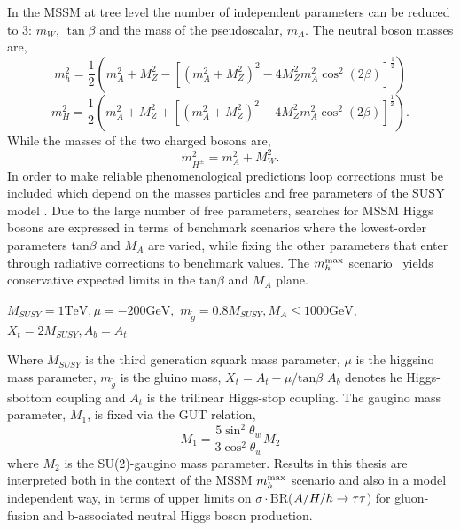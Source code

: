 In the MSSM at tree level the number of independent parameters can be reduced to 3: $m_{W}$,
$\tan{\beta}$ and the mass of the pseudoscalar, $m_{A}$. The neutral boson masses are,
\begin{equation}
m_{h}^{2}=\frac{1}{2}\left(m_{A}^{2}+M_{Z}^{2}-\left[(m_{A}^{2}+
M_{Z}^{2})^{2}-4M_{Z}^{2}m_{A}^{2}\cos^{2}{(2\beta)}\right]^{\frac{1}{2}}\right)
\end{equation}
\nobreak
\begin{equation}
m_{H}^{2}=\frac{1}{2}\left(m_{A}^{2}+M_{Z}^{2}+\left[(m_{A}^{2}+
M_{Z}^{2})^{2}-4M_{Z}^{2}m_{A}^{2}\cos^{2}{(2\beta)}\right]^{\frac{1}{2}}\right).
\end{equation}
While the masses of the two charged bosons are,
\begin{equation}
m_{H^{\pm}}^{2}=m_{A}^{2}+M_{W}^{2}.
\end{equation}
In order to make reliable phenomenological predictions loop corrections must be included
which depend on the masses particles and free parameters of the SUSY model .
Due to the large number of free parameters,
searches for MSSM Higgs bosons are expressed in terms of benchmark scenarios where 
the lowest-order parameters tan$\beta$ and $M_A$ are varied, while fixing the other parameters that 
enter through radiative corrections to benchmark values. 
The $m_{h}^{\rm max}$ scenario~\cite{MHMAX-Carena,MHMAX-Carena-2002}
yields conservative expected limits in the tan$\beta$ and $M_A$ plane. 
\begin{center}
$
M_{SUSY} = 1 \mathrm{TeV}, 
\mu=-200 \mathrm{GeV}, 
$
\linebreak[4]
$
m_{\tilde{g}}=0.8 M_{SUSY}, 
M_{A} \leq 1000 \mathrm{GeV}, 
$
\linebreak[4]
$
X_{t}=2M_{SUSY}, 
A_{b} = A_{t}
$
\end{center}
Where 
$M_{SUSY}$ is the third generation squark mass parameter,
$\mu$ is the higgsino mass parameter,
$m_{\tilde{g}}$ is the gluino mass,
$X_{t}= A_{t}-\mu/\mathrm{tan}\beta$
$A_{b}$ denotes he Higgs-sbottom coupling and
$A_{t}$ is the trilinear Higgs-stop coupling.
The gaugino mass parameter, $M_{1}$, is fixed via the GUT relation,
\begin{equation} 
M_{1}=\frac{5\sin^{2}{\theta_{w}}}{3\cos^{2}{\theta_{w}}}M_{2}
\end{equation}
where $M_{2}$ is the SU(2)-gaugino mass parameter.
Results in this thesis are interpreted both in the context of the MSSM 
$m_{h}^{\rm max}$ scenario and also in a model independent way, 
in terms of upper limits on $\sigma\cdot$BR($A\slash H\slash h\rightarrow\mathrm{\tau}\mathrm{\tau}$) for 
gluon-fusion and b-associated neutral Higgs boson production.

